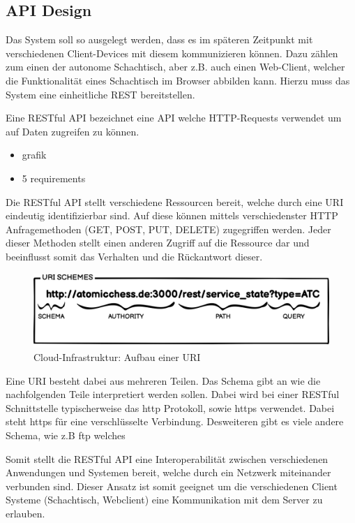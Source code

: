\hypertarget{api-design}{%
\subsection{API Design}\label{api-design}}

Das System soll so ausgelegt werden, dass es im späteren Zeitpunkt mit
verschiedenen Client-Devices mit diesem kommunizieren können. Dazu
zählen zum einen der autonome Schachtisch, aber z.B. auch einen
Web-Client, welcher die Funktionalität eines Schachtisch im Browser
abbilden kann. Hierzu muss das System eine einheitliche REST
bereitstellen.

Eine RESTful API bezeichnet eine API welche HTTP-Requests verwendet um
auf Daten zugreifen zu können.

\begin{itemize}
\tightlist
\item
  grafik
\item
  5 requirements
\end{itemize}

Die RESTful API stellt verschiedene Ressourcen bereit, welche durch eine
URI eindeutig identifizierbar sind. Auf diese können mittels
verschiedenster HTTP Anfragemethoden (GET, POST, PUT, DELETE)
zugegriffen werden. Jeder dieser Methoden stellt einen anderen Zugriff
auf die Ressource dar und beeinflusst somit das Verhalten und die
Rückantwort dieser.

\begin{figure}
\centering
\includegraphics{images/ATC_URI_SCHEMES.png}
\caption{Cloud-Infrastruktur: Aufbau einer URI}
\end{figure}

Eine URI besteht dabei aus mehreren Teilen. Das Schema gibt an wie die
nachfolgenden Teile interpretiert werden sollen. Dabei wird bei einer
RESTful Schnittstelle typischerweise das \gls{http} Protokoll, sowie
\gls{https} verwendet. Dabei steht \gls{https} für eine verschlüsselte
Verbindung. Desweiteren gibt es viele andere Schema, wie z.B \gls{ftp}
welches

Somit stellt die RESTful API eine Interoperabilität zwischen
verschiedenen Anwendungen und Systemen bereit, welche durch ein Netzwerk
miteinander verbunden sind. Dieser Ansatz ist somit geeignet um die
verschiedenen Client Systeme (Schachtisch, Webclient) eine Kommunikation
mit dem Server zu erlauben.

